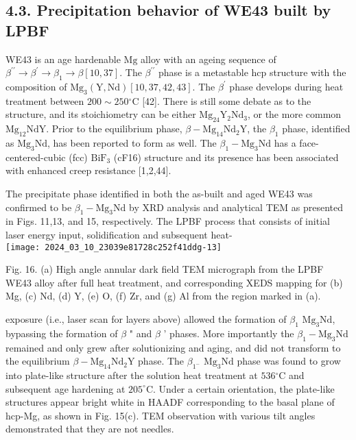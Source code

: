 \documentclass[10pt]{article}
\begin{document}
\subsection*{4.3. Precipitation behavior of WE43 built by LPBF}
WE43 is an age hardenable $\mathrm{Mg}$ alloy with an ageing sequence of $\beta^{\prime \prime} \rightarrow \beta^{\prime} \rightarrow \beta_{1} \rightarrow \beta[10,37]$. The $\beta^{\prime \prime}$ phase is a metastable hcp structure with the composition of $\mathrm{Mg}_{3}(\mathrm{Y}, \mathrm{Nd})[10,37,42,43]$. The $\beta^{\prime}$ phase develops during heat treatment between $200 \sim 250{ }^{\circ} \mathrm{C}$ [42]. There is still some debate as to the structure, and its stoichiometry can be either $\mathrm{Mg}_{24} \mathrm{Y}_{2} \mathrm{Nd}_{3}$, or the more common $\mathrm{Mg}_{12} \mathrm{NdY}$. Prior to the equilibrium phase, $\beta-\mathrm{Mg}_{14} \mathrm{Nd}_{2} \mathrm{Y}$, the $\beta_{1}$ phase, identified as $\mathrm{Mg}_{3} \mathrm{Nd}$, has been reported to form as well. The $\beta_{1}-\mathrm{Mg}_{3} \mathrm{Nd}$ has a face-centered-cubic (fcc) $\mathrm{BiF}_{3}$ (cF16) structure and its presence has been associated with enhanced creep resistance [1,2,44].

The precipitate phase identified in both the as-built and aged WE43 was confirmed to be $\beta_{1}-\mathrm{Mg}_{3} \mathrm{Nd}$ by XRD analysis and analytical TEM as presented in Figs. 11,13, and 15, respectively. The LPBF process that consists of initial laser energy input, solidification and subsequent heat-\\
\texttt{[image: 2024\_03\_10\_23039e81728c252f41ddg-13]}

Fig. 16. (a) High angle annular dark field TEM micrograph from the LPBF WE43 alloy after full heat treatment, and corresponding XEDS mapping for (b) Mg, (c) Nd, (d) $\mathrm{Y}$, (e) $\mathrm{O}$, (f) $\mathrm{Zr}$, and (g) Al from the region marked in (a).

exposure (i.e., laser scan for layers above) allowed the formation of $\beta_{1}$ $\mathrm{Mg}_{3} \mathrm{Nd}$, bypassing the formation of $\beta$ " and $\beta$ ' phases. More importantly the $\beta_{1}-\mathrm{Mg}_{3} \mathrm{Nd}$ remained and only grew after solutionizing and aging, and did not transform to the equilibrium $\beta-\mathrm{Mg}_{14} \mathrm{Nd}_{2} \mathrm{Y}$ phase. The $\beta_{1^{-}}$ $\mathrm{Mg}_{3} \mathrm{Nd}$ phase was found to grow into plate-like structure after the solution heat treatment at $536{ }^{\circ} \mathrm{C}$ and subsequent age hardening at $205^{\circ} \mathrm{C}$. Under a certain orientation, the plate-like structures appear bright white in HAADF corresponding to the basal plane of hcp-Mg, as shown in Fig. 15(c). TEM observation with various tilt angles demonstrated that they are not needles.
\end{document}
